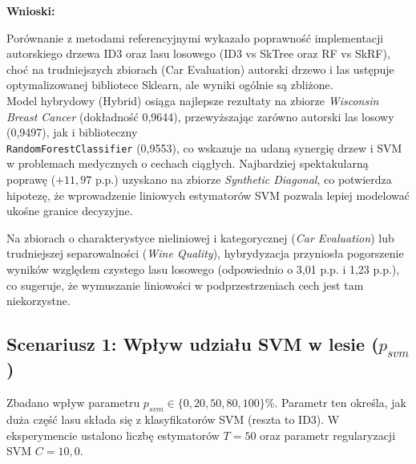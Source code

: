 \documentclass[a4paper,11pt]{article}
\begin{document}
\textbf{Wnioski:}

Porównanie z metodami referencyjnymi wykazało poprawność implementacji autorskiego drzewa ID3 oraz lasu losowego (ID3 vs SkTree oraz RF vs SkRF), choć na trudniejszych zbiorach (Car Evaluation) autorski drzewo i las ustępuje optymalizowanej bibliotece Sklearn, ale wyniki ogólnie są zbliżone.
\\

Model hybrydowy (Hybrid) osiąga najlepsze rezultaty na zbiorze \textit{Wisconsin Breast Cancer} (dokładność 0,9644), przewyższając zarówno autorski las losowy (0,9497), jak i biblioteczny \\ \texttt{RandomForestClassifier} (0,9553), co wskazuje na udaną synergię drzew i SVM w problemach medycznych o cechach ciągłych.
Najbardziej spektakularną poprawę ($+11,97$ p.p.) uzyskano na zbiorze \textit{Synthetic Diagonal}, co potwierdza hipotezę, że wprowadzenie liniowych estymatorów SVM pozwala lepiej modelować ukośne granice decyzyjne.

Na zbiorach o charakterystyce nieliniowej i kategorycznej (\textit{Car Evaluation}) lub trudniejszej separowalności (\textit{Wine Quality}), hybrydyzacja przyniosła pogorszenie wyników względem czystego lasu losowego (odpowiednio o 3,01 p.p. i 1,23 p.p.), co sugeruje, że wymuszanie liniowości w podprzestrzeniach cech jest tam niekorzystne.

\subsection{Scenariusz 1: Wpływ udziału SVM w lesie ($p_{svm}$)}
Zbadano wpływ parametru $p_{svm} \in \{0, 20, 50, 80, 100\}\%$. Parametr ten określa, jak duża część lasu składa się z klasyfikatorów SVM (reszta to ID3). W eksperymencie ustalono liczbę estymatorów $T=50$ oraz parametr regularyzacji SVM $C=10{,}0$.
\end{document}
